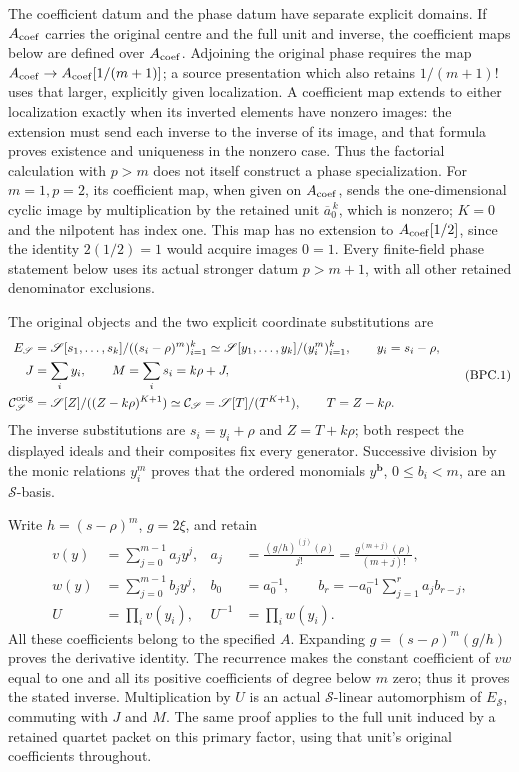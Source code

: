 The coefficient datum and the phase datum have separate explicit domains.
If \(A_{\rm coef}\) carries the original centre and the full unit and
inverse, the coefficient maps below are defined over
\(A_{\rm coef}\).  Adjoining the original phase requires the map
\(A_{\rm coef}\to A_{\rm coef}[1/(m+1)]\); a source presentation
which also retains \(1/(m+1)!\) uses that larger, explicitly given
localization.  A coefficient map extends to either localization
exactly when its inverted elements have nonzero images: the extension
must send each inverse to the inverse of its image, and that formula
proves existence and uniqueness in the nonzero case.  Thus the
factorial calculation with \(p>m\) does not itself construct a
phase specialization.  For \(m=1,p=2\), its coefficient map, when
given on \(A_{\rm coef}\), sends the one-dimensional cyclic image
by multiplication by the retained unit \(\overline a_0^{\,k}\),
which is nonzero; \(K=0\) and the nilpotent has index one.
This map has no extension to \(A_{\rm coef}[1/2]\), since the
identity \(2(1/2)=1\) would acquire images \(0=1\).
Every finite-field phase statement below uses its actual stronger
datum \(p>m+1\), with all other retained denominator exclusions.

The original objects and the two explicit coordinate substitutions are
\[
\begin{split}
 E_{\mathscr S}&=\mathscr S[s_1,\ldots,s_k]/((s_i-\rho)^m)_{i=1}^k
       \simeq \mathscr S[y_1,\ldots,y_k]/(y_i^m)_{i=1}^k,
       \qquad y_i=s_i-\rho,\\
 J&=\sum_i y_i,\qquad M=\sum_i s_i=k\rho+J,\\
 \mathcal C_{\mathscr S}^{\rm orig}
   &=\mathscr S[Z]/((Z-k\rho)^{K+1})
       \simeq\mathcal C_{\mathscr S}=\mathscr S[T]/(T^{K+1}),
       \qquad T=Z-k\rho .
\end{split}
\tag{BPC.1}\label{eq:bpc1}
\]
The inverse substitutions are \(s_i=y_i+\rho\) and
\(Z=T+k\rho\); both respect the displayed ideals and their
composites fix every generator.  Successive division by the monic
relations \(y_i^m\) proves that the ordered monomials
\(y^{\mathbf b}\), \(0\leq b_i<m\), are an \(\mathscr S\)-basis.

Write \(h=(s-\rho)^m\), \(g=2\xi\), and retain
\[
\begin{aligned}
 v(y)&=\sum_{j=0}^{m-1}a_jy^j,
 &a_j&=\frac{(g/h)^{(j)}(\rho)}{j!}
       =\frac{g^{(m+j)}(\rho)}{(m+j)!},\\
 w(y)&=\sum_{j=0}^{m-1}b_jy^j,
 &b_0&=a_0^{-1},\qquad
 b_r=-a_0^{-1}\sum_{j=1}^r a_jb_{r-j},\\
 U&=\prod_i v(y_i),&U^{-1}&=\prod_i w(y_i).
\end{aligned}
\tag{BPC.2}\label{eq:bpc2}
\]
All these coefficients belong to the specified \(A\).  Expanding
\(g=(s-\rho)^m(g/h)\) proves the derivative identity.  The
recurrence makes the constant coefficient of \(vw\) equal to one
and all its positive coefficients of degree below \(m\) zero;
thus it proves the stated inverse.  Multiplication by \(U\) is
an actual \(\mathscr S\)-linear automorphism of \(E_{\mathscr S}\), commuting with
\(J\) and \(M\).  The same proof applies to the full unit induced
by a retained quartet packet on this primary factor, using that
unit's original coefficients throughout.

